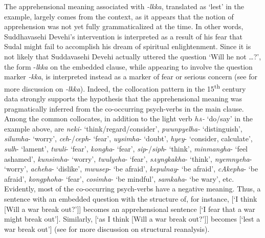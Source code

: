 \documentclass[output=paper,colorlinks,citecolor=brown]{langscibook}
\begin{document}
\largerpage
\noindent The apprehensional meaning associated with \textit{-lkka}, translated as `lest' in the example, largely comes from the context, as it appears that the notion of apprehension was not yet fully grammaticalized at the time. In other words, Suddhavasehi Devehi's intervention is interpreted as a result of his fear that Sudal might fail to accomplish his dream of spiritual enlightenment. Since it is not likely that Suddavasehi Devehi actually uttered the question `Will he not …?', the form  \nobreakdash-\textit{lkka} on the embedded clause, while appearing to involve the question marker \textit{-kka}, is interpreted instead as a marker of fear or serious concern (see  for more discussion on \textit{-lkka}). Indeed, the collocation pattern in the 15\textsuperscript{th} century  data strongly supports the hypothesis that the apprehensional meaning was pragmatically inferred from the co-occurring psych-verbs in the main clause. Among the common collocates, in addition to the light verb \textit{h\textsc{a}-} `do/say' in the example above, are \textit{neki-} `think/regard/consider', \textit{pwunpyelha-} `distinguish', \textit{silumha}- `worry', \textit{ceh}-/\textit{ceph}- `fear', \textit{uysimha}- `doubt', \textit{hyey}- `consider, calculate', \textit{sulh}- `lament', \textit{twuli}- `fear', \textit{kongha}- `fear', \textit{sip}-/\textit{siph}- `think', \textit{minmangha}- `feel ashamed', \textit{kunsimha}- `worry', \textit{twulyeha}- `fear', \textit{s\textsc{a}yngkakha}- `think', \textit{nyemnyeha}- `worry', \textit{acheha}- `dislike', \textit{mwusep}- `be afraid', \textit{kepulnay}- `be afraid', \textit{cAkepha}- `be afraid', \textit{kongphoha}- `fear', \textit{cosimha}- `be mindful', \textit{samkaha}- `be wary', etc. Evidently, most of the co-occurring psych-verbs have a negative meaning. Thus, a sentence with an embedded question with the structure of, for instance, [`I think [Will a war break out?']] becomes an apprehensional sentence [`I fear that a war might break out']. Similarly,  [`as I think [Will a war break out?']] becomes [`lest a war break out'] (see  for more discussion on structural reanalysis).
\end{document}
